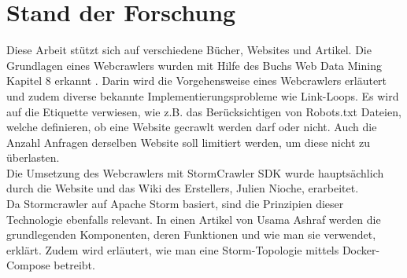 \chapter{Stand der Forschung}
\label{chap:forschung}
Diese Arbeit stützt sich auf verschiedene Bücher, Websites und Artikel.
Die Grundlagen eines Webcrawlers wurden mit Hilfe des Buchs \glqq Web Data Mining\grqq{} Kapitel 8 erkannt \cite[p. 311ff.]{liu2007web}. 
Darin wird die Vorgehensweise eines Webcrawlers erläutert und zudem diverse bekannte Implementierungsprobleme wie Link-Loops.
Es wird auf die Etiquette verwiesen, wie z.B. das Berücksichtigen von Robots.txt Dateien, welche definieren, ob eine Website gecrawlt werden darf oder nicht\cite[p. 353ff.]{liu2007web}.
Auch die Anzahl Anfragen derselben Website soll limitiert werden, um diese nicht zu überlasten\cite[p. 353ff.]{liu2007web}.\\
Die Umsetzung des Webcrawlers mit StormCrawler SDK wurde hauptsächlich durch die Website\cite{StormCrawler} und das Wiki des Erstellers\cite{GithubStormCrawler}, Julien Nioche, erarbeitet.\\
Da Stormcrawler auf Apache Storm basiert, sind die Prinzipien dieser Technologie ebenfalls relevant.
In einen Artikel von Usama Ashraf werden die grundlegenden Komponenten, deren Funktionen und wie man sie verwendet, erklärt.
Zudem wird erläutert, wie man eine Storm-Topologie mittels Docker-Compose betreibt\cite{ApacheStormDev}.\\
